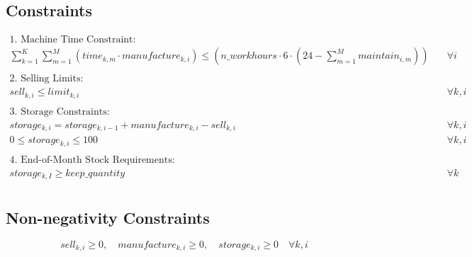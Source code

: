 \documentclass{article}
\begin{document}
\subsection*{Constraints}
\begin{align*}
\text{1. Machine Time Constraint:} & \\
\sum_{k=1}^{K} \sum_{m=1}^{M} (time_{k,m} \cdot manufacture_{k,i}) \leq (n\_workhours \cdot 6 \cdot (24 - \sum_{m=1}^{M} maintain_{i,m})) & \quad \forall i \\
\\
\text{2. Selling Limits:} & \\
sell_{k,i} \leq limit_{k,i} & \quad \forall k, i \\
\\
\text{3. Storage Constraints:} & \\
storage_{k,i} = storage_{k,i-1} + manufacture_{k,i} - sell_{k,i} & \quad \forall k, i \\
0 \leq storage_{k,i} \leq 100 & \quad \forall k, i \\
\\
\text{4. End-of-Month Stock Requirements:} & \\
storage_{k,I} \geq keep\_quantity & \quad \forall k \\
\end{align*}

\subsection*{Non-negativity Constraints}
\[
sell_{k,i} \geq 0, \quad manufacture_{k,i} \geq 0, \quad storage_{k,i} \geq 0 \quad \forall k, i
\]
\end{document}
